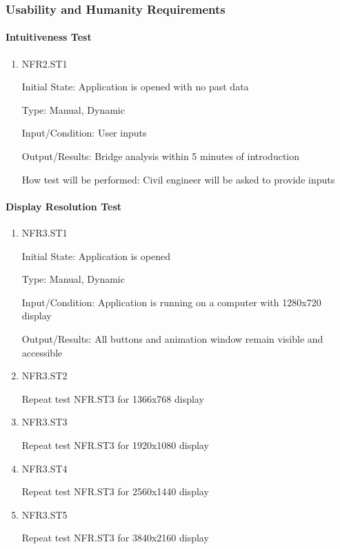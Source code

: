 \documentclass[12pt, titlepage]{article}
\begin{document}
\subsubsection{Usability and Humanity Requirements}
		
\paragraph{Intuitiveness Test}

\begin{enumerate}

\item{NFR2.ST1\\}

Initial State: Application is opened with no past data

Type: Manual, Dynamic

Input/Condition: User inputs

Output/Results: Bridge analysis within 5 minutes of introduction

How test will be performed: Civil engineer will be asked to provide inputs

\end{enumerate}
		
\paragraph{Display Resolution Test}

\begin{enumerate}

\item{NFR3.ST1\\}

Initial State: Application is opened

Type: Manual, Dynamic

Input/Condition: Application is running on a computer with 1280x720 display

Output/Results: All buttons and animation window remain visible and accessible

\item{NFR3.ST2\\}

Repeat test NFR.ST3 for 1366x768 display

\item{NFR3.ST3\\}

Repeat test NFR.ST3 for 1920x1080 display

\item{NFR3.ST4\\}

Repeat test NFR.ST3 for 2560x1440 display

\item{NFR3.ST5\\}

Repeat test NFR.ST3 for 3840x2160 display

\end{enumerate}
\end{document}
